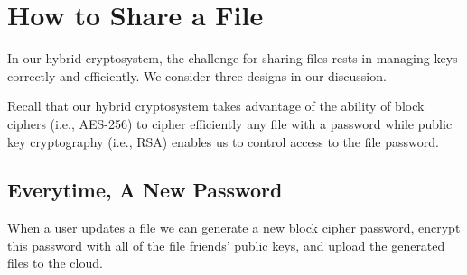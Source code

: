 \section{How to Share a File}

In our hybrid cryptosystem, the challenge for sharing files rests in
managing keys correctly and efficiently. We consider three designs in
our discussion.

Recall that our hybrid cryptosystem takes advantage of the ability of
block ciphers (i.e., AES-256) to cipher efficiently any file with a
password while public key cryptography (i.e., RSA) enables us to
control access to the file password.

\subsection{Everytime, A New Password}

When a user updates a file we can generate a new block cipher
password, encrypt this password with all of the file friends' public
keys, and upload the generated files to the cloud.

